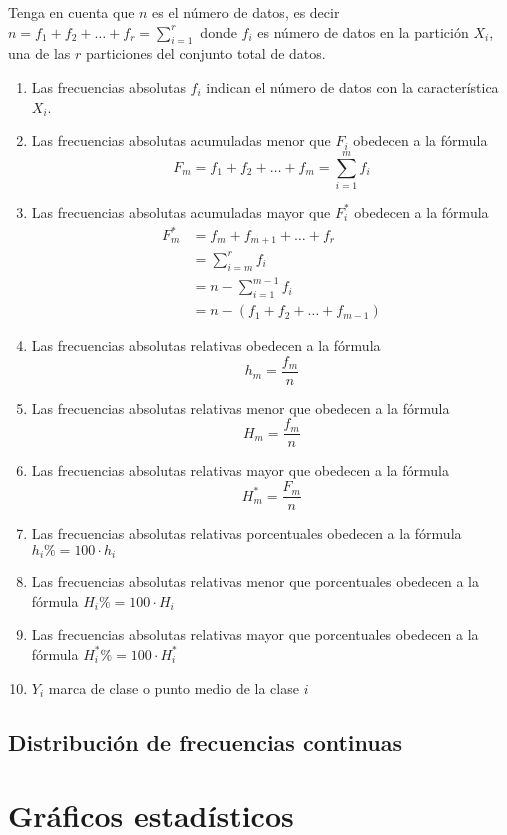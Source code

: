 \documentclass[a4paper]{report}
\begin{document}
Tenga en cuenta que $n$ es el número de datos, es decir $n=f_1+f_2+\ldots+f_r=\sum_{i=1}^r$ donde $f_i$ es número de datos en la partición $X_i$, una de las $r$ particiones del conjunto total de datos.

\begin{enumerate}
	\item  Las frecuencias absolutas $f_i$ indican el número de datos con la característica $X_i$.
	\item   Las frecuencias absolutas acumuladas menor que $F_i$ obedecen a la fórmula $$F_m=f_1+f_2+\ldots+f_m=\sum_{i=1}^mf_i$$
	\item   Las frecuencias absolutas acumuladas mayor que $F_i^*$ obedecen a la fórmula
  $$
  \begin{aligned}
  	F_m^*&=f_m+f_{m+1}+\ldots+f_r\\
  	&=\sum_{i=m}^rf_i\\
  	&=n-\sum_{i=1}^{m-1}f_i\\
  	&=n-\left(f_1+f_{2}+\ldots+f_{m-1}\right)
  \end{aligned}
  $$
	\item   Las frecuencias absolutas relativas obedecen a la fórmula $$h_m=\frac{f_m}{n}$$
	\item   Las frecuencias absolutas relativas menor que obedecen a la fórmula $$H_m=\frac{f_m}{n}$$
	\item   Las frecuencias absolutas relativas mayor que obedecen a la fórmula $$H_m^*=\frac{F_m}{n}$$
	\item   Las frecuencias absolutas relativas porcentuales obedecen a la fórmula $h_i\%=100\cdot h_i$
	\item  Las frecuencias absolutas relativas menor que porcentuales obedecen a la fórmula $H_i\%=100\cdot H_i$
	\item   Las frecuencias absolutas relativas mayor que porcentuales obedecen a la fórmula $H_i^*\%=100\cdot H_i^*$
	\item  $Y_i$ marca de clase o punto medio de la clase $i$
\end{enumerate}


\subsection{Distribución de frecuencias continuas}


\section{Gráficos estadísticos}
\end{document}
